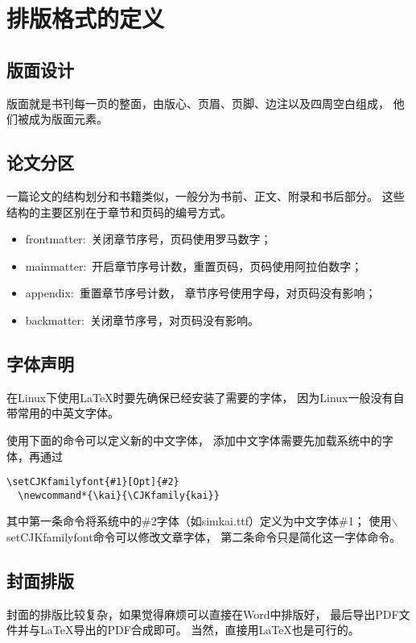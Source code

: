 
\chapter{排版格式的定义}

\section{版面设计}
版面就是书刊每一页的整面，由版心、页眉、页脚、边注以及四周空白组成，
他们被成为版面元素\cite[139]{man}。


\section{论文分区}
一篇论文的结构划分和书籍类似，一般分为书前、正文、附录和书后部分。
这些结构的主要区别在于章节和页码的编号方式。
\begin{itemize}
  \item frontmatter:\ 关闭章节序号，页码使用罗马数字；
  \item mainmatter:\ 开启章节序号计数，重置页码，页码使用阿拉伯数字；
  \item appendix:\ 重置章节序号计数， 章节序号使用字母，对页码没有影响；
  \item backmatter:\ 关闭章节序号，对页码没有影响。
\end{itemize}


\section{字体声明}
在Linux下使用\LaTeX 时要先确保已经安装了需要的字体，
因为Linux一般没有自带常用的中英文字体。

使用下面的命令可以定义新的中文字体，
添加中文字体需要先加载系统中的字体，再通过
\begin{lstlisting}[style=Latex]
  \setCJKfamilyfont{#1}[Opt]{#2}
  \newcommand*{\kai}{\CJKfamily{kai}}
\end{lstlisting}
其中第一条命令将系统中的\#2字体（如simkai.ttf）定义为中文字体\#1；
使用$\backslash$setCJKfamilyfont命令可以修改文章字体，
第二条命令只是简化这一字体命令。


\section{封面排版}
封面的排版比较复杂，如果觉得麻烦可以直接在Word中排版好，
最后导出PDF文件并与\LaTeX 导出的PDF合成即可。
当然，直接用\LaTeX 也是可行的。

